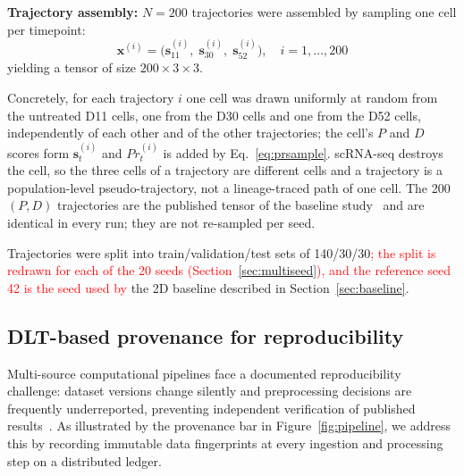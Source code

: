 \documentclass[5p,times,twocolumn]{elsarticle}
\newcommand{\rtag}[1]{}
\newcommand{\rev}[2]{\rtag{#1}\textcolor{red}{#2}}
\newenvironment{revblock}[1]{\par\color{red}\rtag{#1}\ignorespaces}{\par}
\begin{document}
\textbf{Trajectory assembly:}
$N = 200$ trajectories were assembled by sampling one cell
per timepoint:
%
\begin{equation}
  \mathbf{x}^{(i)} =
    \bigl(\mathbf{s}^{(i)}_{11},\;
           \mathbf{s}^{(i)}_{30},\;
           \mathbf{s}^{(i)}_{52}\bigr),
  \quad i = 1,\ldots,200
  \label{eq:traj}
\end{equation}
%
yielding a tensor of size $200 \times 3 \times 3$.
\begin{revblock}{R1.2}
  Concretely, for each trajectory $i$ one cell was drawn
  uniformly at random from the untreated D11 cells, one from
  the D30 cells and one from the D52 cells, independently of
  each other and of the other trajectories; the cell's $P$ and
  $D$ scores form $\mathbf{s}^{(i)}_{t}$ and $Pr^{(i)}_{t}$ is
  added by Eq.~\eqref{eq:prsample}.
  scRNA-seq destroys the cell, so the three cells of a trajectory
  are different cells and a trajectory is a population-level
  pseudo-trajectory, not a lineage-traced path of one cell.
  The 200 $(P, D)$ trajectories are the published tensor of the
  baseline study~\cite{kanu2026transformer} and are identical in
  every run; they are not re-sampled per seed.
\end{revblock}
Trajectories were split into train/validation/test sets
of 140/30/30\rev{R1.4,R2.9}{; the split is redrawn for each of
  the 20 seeds (Section~\ref{sec:multiseed}), and the reference
  seed 42 is the seed used by} the 2D baseline described in
Section~\ref{sec:baseline}.

\subsection{\textbf{DLT-based provenance for reproducibility}}
\label{sec:dlt}

Multi-source computational pipelines face a documented
reproducibility challenge: dataset versions change silently
and preprocessing decisions are frequently underreported,
preventing independent verification of published
results~\cite{kanu2024blockchain}.
As illustrated by the provenance bar in
Figure~\ref{fig:pipeline}, we address this by recording
immutable data fingerprints at every ingestion and
processing step on a distributed ledger.
\end{document}
